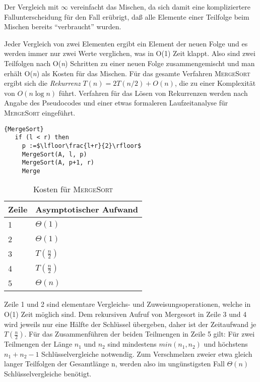 \documentclass[ngerman,draft,parskip=half*,twoside]{scrreprt}
\theoremstyle{break}
\begin{document}
Der Vergleich mit $\infty$ vereinfacht das Mischen, da sich damit eine kompliziertere Fallunterscheidung für den Fall erübrigt, 
daß alle Elemente einer Teilfolge beim Mischen bereits "`verbraucht"' wurden.

Jeder Vergleich von zwei Elementen ergibt ein Element der neuen Folge und es werden immer nur zwei Werte verglichen, was in
O(1) Zeit klappt. Also sind zwei Teilfolgen nach O(\textit{n}) Schritten zu einer neuen Folge zusammengemischt und man erhält
O(\textit{n}) als Kosten für das Mischen.
Für das gesamte Verfahren \textsc{MergeSort} ergibt sich die \textit{Rekurrenz} $T(n)=2T(n/2)+O(n)$, die zu einer Komplexität von $O(n
\log n)$ führt. Verfahren für das Lösen von Rekurrenzen werden nach Angabe des Pseudocodes und einer etwas
formaleren Laufzeitanalyse für \textsc{MergeSort} eingeführt.

%
\begin{Algorithmus}[h]
    \begin{lstlisting}[frame=tlrb, mathescape=true, title=\textsc{MergeSort}, gobble=3]{MergeSort}   
   if (l < r) then
     p :=$\lfloor\frac{l+r}{2}\rfloor$ 
     MergeSort(A, l, p)
     MergeSort(A, p+1, r)
     Merge
    \end{lstlisting}
  \end{Algorithmus}
  
\begin{table}[h]
  \begin{tabular}{*{2}{l}}
    Zeile & Asymptotischer Aufwand\\
    \hline
    1 & $\Theta(1)$\\
    2 & $\Theta(1)$\\
    3 & $T(\frac{n}{2})$\\
    4 & $T(\frac{n}{2})$\\
    5 & $\Theta(n)$\\
  \end{tabular}
  \caption{Kosten für \textsc{MergeSort}} 
\end{table}

Zeile 1 und 2 sind elementare Vergleichs- und Zuweisungsoperationen, welche in O(1) Zeit möglich sind. 
Dem rekursiven Aufruf von Mergesort in Zeile 3 und 4 wird jeweils nur eine Hälfte der Schlüssel übergeben, 
daher ist der Zeitaufwand je $T(\frac{n}{2})$. Für das Zusammenführen der beiden Teilmengen in Zeile 5 gilt: 
Für zwei Teilmengen der Länge $n_1$ und $n_2$ sind mindestens $min(n_1,n_2)$ und höchstens $n_1 + n_2 -1$ Schlüsselvergleiche notwendig. 
Zum Verschmelzen zweier etwa gleich langer Teilfolgen der Gesamtlänge n, werden also im ungünstigsten Fall $\Theta(n)$ Schlüsselvergleiche benötigt.
\end{document}

